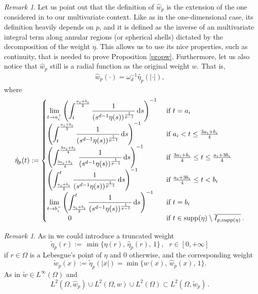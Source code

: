 \documentclass[11pt,leqno]{amsart}
\theoremstyle{remark}
\newtheorem{oss}[teo]{Remark}
\theoremstyle{definition}
\theoremstyle{definition}
\newcommand{\tildew}{\tilde w}
\newcommand{\wstar}{{\hat w}}
\newcommand{\supp}{\mathrm{supp}}
\def\de{{\rm d}}
\begin{document}
\begin{oss}\label{newoss}
Let us point out that the definition of $\hat{w}_{p}$ is the extension of the one considered in \cite{CCMH1} to our multivariate context. Like as in the one-dimensional case, its definition heavily depends on $p$, and it is defined as the inverse of an multivariate integral term along annular regions (or spherical shells) dictated by the decomposition of the weight $\eta$. This  allows us to use its nice properties, such as continuity, that  is needed to prove Proposition \ref{propw}. Furthermore, let us also notice that $\wstar_{p}$ still is a radial function as the original weight $w$. That is,
\begin{align*}
\label{relation}
\wstar_{p}(\cdot)=\omega_{d}^{-1}\hat{\eta}_{p}(\vert \cdot\vert),
\end{align*}
where
\begin{equation*}
\hat{\eta}_{p}(t):=
\begin{cases}
\displaystyle\lim_{t\to a_i^+}  \left(\int_{t}^{\frac{a_{i}+b_{i}}{2}}\frac{1}{(s^{d-1}\eta(s))^{\frac{1}{p-1}}}\,\de s\right)^{-1}    &\text{ if } t=a_i \\
\left(\displaystyle\int_{t}^{\frac{a_{i}+b_{i}}{2}}\frac{1}{(s^{d-1}\eta(s))^{\frac{1}{p-1}}}\,\de s\right)^{-1} &\text{ if } {a_i}< t \leq {{3a_i+b_i}\over{4}}\\
\left(\displaystyle\int_{\frac{3a_{i}+b_{i}}{4}}^{\frac{3a_{i}+b_{i}}{4}}\frac{1}{(s^{d-1}\eta(s))^{\frac{1}{p-1}}}\,\de s\right)^{-1} &\text{ if } {{3a_i+b_i}\over{4}}\leq t\leq {{a_i+3b_i}\over{4}}\\
\left(\displaystyle\int_{\frac{a_{i}+b_{i}}{2}}^{t}\frac{1}{(s^{d-1}\eta(s))^{\frac{1}{p-1}}}\,\de s\right)^{-1} &\text{ if } {{a_i+3b_i}\over{4}}\leq t<b_i\\
\displaystyle\lim_{t\to b_i^-}  \left(\displaystyle\int_{\frac{a_{i}+b_{i}}{2}}^{t}\frac{1}{(s^{d-1}\eta(s))^{\frac{1}{p-1}}}\,\de s\right)^{-1}    &\text{ if } t=b_i\\
\ \ \ \ \ \ \ \ \ 0&\text{ if } t\in \supp(\eta)\setminus \overline{I_{p,\supp(\eta)}}\,.
\end{cases}
\end{equation*}
\end{oss}
\begin{oss}\label{serra}
As in \cite[Sect. 4.2]{CC} we could introduce a truncated weight
\begin{equation*}\label{tildeeta}
\tilde \eta_p(r):=\,\min\{\eta(r),\,\hat{\eta}_{p}(r),\,1\}\,, \ \ \ r\in [0,+\infty]
\end{equation*}
if $r\in\Omega$ is a Lebesgue's point of $\eta$ and $0$ otherwise, and the corresponding weight
\begin{equation*}\label{tildew}
\tilde w_p(x):=\tilde \eta_p(|x|)=\min\{w(x),\,\wstar_p(x),\,1\}.
\end{equation*}
As in \cite[Proposition 4.6]{CC} $\tildew\in L^\infty(\Omega)$ and
\begin{equation}\label{incltildew}
L^2(\Omega,\wstar_p)\cup L^2(\Omega,w)\cup L^2(\Omega)\subset L^2(\Omega,\tildew_p)\,.
\end{equation}
\end{oss}
\end{document}
